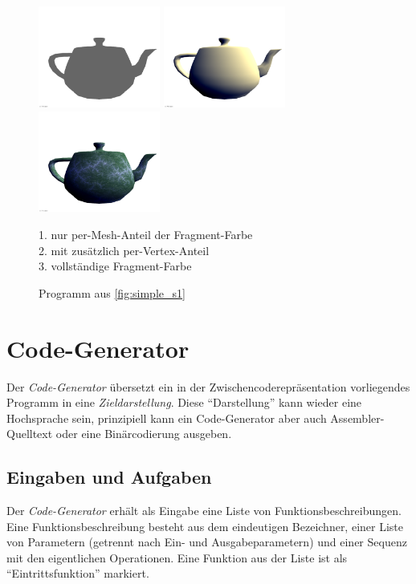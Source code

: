 \documentclass[twoside,a4paper,fleqn,12pt]{book}
\begin{document}
\begin{figure}[h]
  \centering
  \includegraphics[width=4cm]{simple_s1_mesh}\quad
  \includegraphics[width=4cm]{simple_s1_vert}\quad
  \includegraphics[width=4cm]{simple_s1_frag}
  \caption{Programm aus \ref{fig:simple_s1}}
  \small 1. nur per-Mesh-Anteil der Fragment-Farbe\\
  2. mit zusätzlich per-Vertex-Anteil\\
  3. vollständige Fragment-Farbe\\
  \label{fig:simple_s1_images}
\end{figure}

\newpage
\section{Code-Generator}

Der \emph{Code-Generator} übersetzt ein in der Zwischencoderepräsentation vorliegendes Programm in eine \emph{Zieldarstellung}.
Diese "`Darstellung"' kann wieder eine Hochsprache sein, prinzipiell kann ein Code-Generator aber auch Assembler-Quelltext oder eine
Binärcodierung ausgeben.

\subsection{Eingaben und Aufgaben}

Der \emph{Code-Generator} erhält als Eingabe eine Liste von Funktionsbeschreibungen.
Eine Funktionsbeschreibung besteht aus dem eindeutigen Bezeichner, einer Liste von Parametern (getrennt nach Ein- und Ausgabeparametern)
und einer Sequenz mit den eigentlichen Operationen. Eine Funktion aus der Liste ist als "`Eintrittsfunktion"' markiert.
\end{document}
